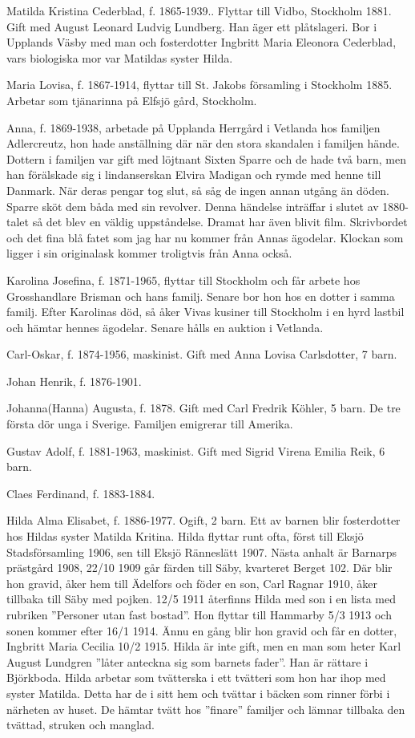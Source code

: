 Matilda Kristina Cederblad, f. 1865-1939.. Flyttar till Vidbo, Stockholm 1881. Gift med August Leonard Ludvig Lundberg. Han äger ett plåtslageri. Bor i Upplands Väsby med man och fosterdotter Ingbritt Maria Eleonora Cederblad, vars biologiska mor var Matildas syster Hilda.

Maria Lovisa, f. 1867-1914, flyttar till St. Jakobs församling i Stockholm 1885. Arbetar som tjänarinna på Elfsjö gård, Stockholm.

Anna, f. 1869-1938, arbetade på Upplanda Herrgård i Vetlanda hos familjen Adlercreutz, hon hade anställning där när den stora skandalen i familjen hände. Dottern i familjen var gift med löjtnant Sixten Sparre och de hade två barn, men han förälskade sig i  lindanserskan Elvira Madigan och rymde med henne till Danmark. När deras pengar tog slut, så såg de ingen annan utgång än döden. Sparre sköt dem båda med sin revolver. Denna händelse inträffar i slutet av 1880-talet så det blev en väldig uppståndelse. Dramat har även blivit film. Skrivbordet och det fina blå fatet som jag har nu  kommer från Annas ägodelar. Klockan som ligger i sin originalask kommer troligtvis från Anna också.


Karolina Josefina, f. 1871-1965, flyttar till Stockholm och får arbete hos Grosshandlare Brisman och hans familj. Senare bor hon hos en dotter i samma familj.
Efter Karolinas död, så åker Vivas kusiner till Stockholm i en hyrd lastbil och hämtar hennes ägodelar. Senare hålls en auktion i Vetlanda.

Carl-Oskar, f. 1874-1956, maskinist. Gift med Anna Lovisa Carlsdotter, 7 barn.

Johan Henrik, f. 1876-1901.

Johanna(Hanna) Augusta, f. 1878. Gift med Carl Fredrik Köhler, 5 barn. De tre första dör unga i Sverige. Familjen emigrerar till Amerika.

Gustav Adolf, f. 1881-1963, maskinist. Gift med Sigrid Virena Emilia Reik, 6 barn.

Claes Ferdinand, f. 1883-1884.

Hilda Alma Elisabet, f. 1886-1977. Ogift, 2 barn. Ett av barnen blir fosterdotter hos Hildas syster Matilda Kritina. Hilda flyttar runt ofta, först till Eksjö Stadsförsamling 1906, sen till Eksjö Ränneslätt 1907. Nästa anhalt är Barnarps prästgård 1908,  22/10 1909 går färden till Säby, kvarteret Berget 102. Där blir hon gravid, åker hem till Ädelfors och föder en son, Carl Ragnar 1910, åker tillbaka till Säby med pojken. 12/5 1911 återfinns Hilda med son i en lista med rubriken
”Personer utan fast bostad”. Hon  flyttar till Hammarby 5/3 1913 och sonen kommer efter 16/1 1914. Ännu en gång blir hon gravid  och får en dotter, Ingbritt Maria Cecilia 10/2 1915. Hilda är inte gift, men en man som heter Karl August Lundgren ”låter anteckna sig som barnets fader”. Han är rättare i Björkboda.
Hilda arbetar som tvätterska i ett tvätteri som hon har ihop med syster Matilda. Detta har de i sitt hem och tvättar i bäcken som rinner förbi i närheten av huset. De hämtar tvätt hos ”finare” familjer och lämnar tillbaka den tvättad, struken och manglad.